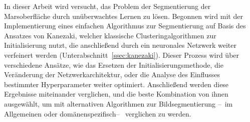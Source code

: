 In dieser Arbeit wird versucht, das Problem der Segmentierung der Marsoberfläche durch unüberwachtes Lernen zu lösen. Begonnen wird mit der Implementierung eines einfachen Algorithmus zur Segmentierung auf Basis des Ansatzes von Kanezaki\cite{kanezaki_18}, welcher klassische Clusteringalgorithmen zur Initialisierung nutzt, die anschließend durch ein neuronales Netzwerk weiter verfeinert werden (\vgl Unterabschnitt~\ref{ssec:kanezaki}). Dieser Prozess wird über verschiedene Ansätze, wie \zB das Ersetzen der Initialisierungsmethode, die Veränderung der Netzwerkarchitektur, oder die Analyse des Einflusses bestimmter Hyperparameter weiter optimiert. Anschließend werden diese Ergebnisse miteinander verglichen, und die beste Kombination von ihnen ausgewählt, um mit alternativen Algorithmen zur Bildsegmentierung --~im Allgemeinen oder domänenspezifisch--~ verglichen zu werden.